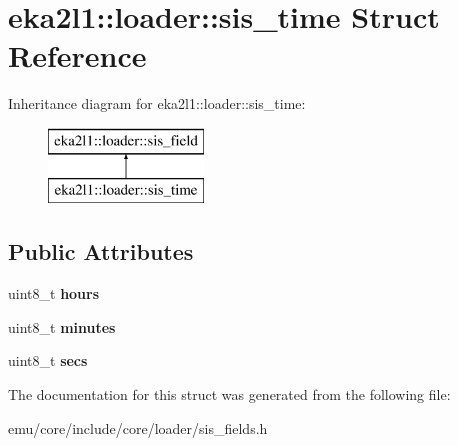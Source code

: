 \hypertarget{structeka2l1_1_1loader_1_1sis__time}{}\section{eka2l1\+:\+:loader\+:\+:sis\+\_\+time Struct Reference}
\label{structeka2l1_1_1loader_1_1sis__time}
Inheritance diagram for eka2l1\+:\+:loader\+:\+:sis\+\_\+time\+:\begin{figure}[H]
\begin{center}
\leavevmode
\includegraphics[height=2.000000cm]{structeka2l1_1_1loader_1_1sis__time}
\end{center}
\end{figure}
\subsection*{Public Attributes}
\begin{DoxyCompactItemize}
\item 
\mbox{\label{structeka2l1_1_1loader_1_1sis__time_ab0923d0836b05d2a69000466ee93e6d2}} 
uint8\+\_\+t {\bfseries hours}
\item 
\mbox{\label{structeka2l1_1_1loader_1_1sis__time_ac129e3acaca38e07d97612126dd9d9ee}} 
uint8\+\_\+t {\bfseries minutes}
\item 
\mbox{\label{structeka2l1_1_1loader_1_1sis__time_a7a627d444def84b8959e3d693e997c5b}} 
uint8\+\_\+t {\bfseries secs}
\end{DoxyCompactItemize}


The documentation for this struct was generated from the following file\+:\begin{DoxyCompactItemize}
\item 
emu/core/include/core/loader/sis\+\_\+fields.\+h\end{DoxyCompactItemize}
